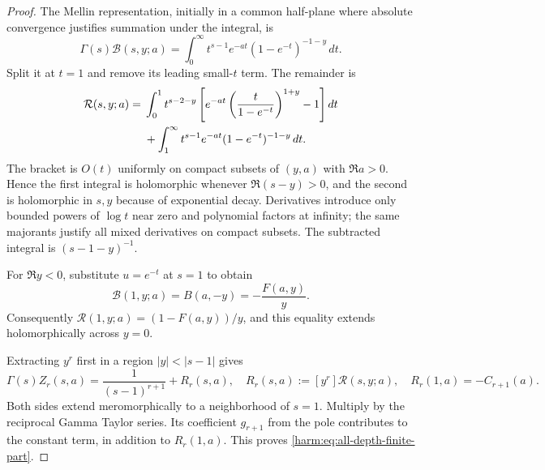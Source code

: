 \begin{proof}
The Mellin representation, initially in a common half-plane where
absolute convergence justifies summation under the integral, is
\[
 \Gamma(s)\mathcal B(s,y;a)
 =\int_0^\infty t^{s-1}e^{-at}(1-e^{-t})^{-1-y}\,dt.
\]
Split it at $t=1$ and remove its leading small-$t$ term.  The remainder is
\begin{align}\label{harm:eq:holomorphic-remainder}
 \mathcal R(s,y;a)
 ={}&\int_0^1 t^{s-2-y}
       \left[e^{-at}\left(\frac{t}{1-e^{-t}}\right)^{1+y}-1\right]dt\notag\\
 &+\int_1^\infty t^{s-1}e^{-at}(1-e^{-t})^{-1-y}\,dt.
\end{align}
The bracket is $O(t)$ uniformly on compact subsets of $(y,a)$ with
$\Re a>0$.  Hence the first integral is holomorphic whenever
$\Re(s-y)>0$, and the second is holomorphic in $s,y$ because of
exponential decay.  Derivatives introduce only bounded powers of
$\log t$ near zero and polynomial factors at infinity; the same
majorants justify all mixed derivatives on compact subsets.  The
subtracted integral is $(s-1-y)^{-1}$.

For $\Re y<0$, substitute $u=e^{-t}$ at $s=1$ to obtain
\[
 \mathcal B(1,y;a)=B(a,-y)=-\frac{F(a,y)}y.
\]
Consequently $\mathcal R(1,y;a)=(1-F(a,y))/y$, and this equality extends
holomorphically across $y=0$.

Extracting $y^r$ first in a region $|y|<|s-1|$ gives
\[
 \Gamma(s)Z_r(s,a)=\frac1{(s-1)^{r+1}}+R_r(s,a),
 \quad R_r(s,a):=[y^r]\mathcal R(s,y;a),
 \quad R_r(1,a)=-C_{r+1}(a).
\]
Both sides extend meromorphically to a neighborhood of $s=1$.  Multiply
by the reciprocal Gamma Taylor series.  Its coefficient $g_{r+1}$
from the pole contributes to the constant term, in addition to
$R_r(1,a)$.  This proves \eqref{harm:eq:all-depth-finite-part}.
\end{proof}

